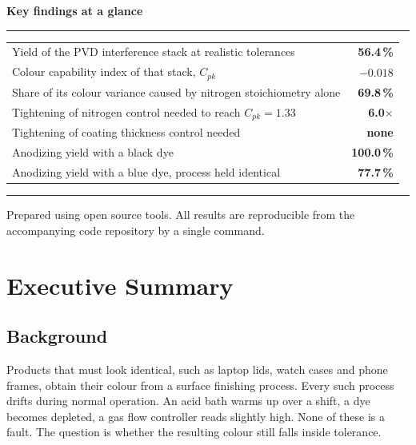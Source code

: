 \documentclass[11pt,a4paper]{article}
\newcommand{\Cpk}{\ensuremath{C_{pk}}}
\begin{document}
\begin{titlepage}
\vspace{1.0cm}

\begin{minipage}{0.86\textwidth}
{\bfseries\color{accent} Key findings at a glance}
\vspace{4pt}
\hrule
\vspace{6pt}
\small
\begin{tabular}{@{}p{8.6cm}r@{}}
Yield of the PVD interference stack at realistic tolerances
  & \textbf{56.4\,\%} \\[2pt]
Colour capability index of that stack, \Cpk
  & \textbf{$-0.018$} \\[2pt]
Share of its colour variance caused by nitrogen stoichiometry alone
  & \textbf{69.8\,\%} \\[2pt]
Tightening of nitrogen control needed to reach $\Cpk = 1.33$
  & \textbf{6.0$\times$} \\[2pt]
Tightening of coating thickness control needed
  & \textbf{none} \\[2pt]
Anodizing yield with a black dye
  & \textbf{100.0\,\%} \\[2pt]
Anodizing yield with a blue dye, process held identical
  & \textbf{77.7\,\%} \\
\end{tabular}
\vspace{6pt}
\hrule
\end{minipage}

\vfill
{\small Prepared using open source tools. All results are reproducible from the
accompanying code repository by a single command.}
\end{titlepage}

\setcounter{page}{2}

\section*{Executive Summary}

\subsection*{Background}

Products that must look identical, such as laptop lids, watch cases and phone
frames, obtain their colour from a surface finishing process. Every such
process drifts during normal operation. An acid bath warms up over a shift, a
dye becomes depleted, a gas flow controller reads slightly high. None of these
is a fault. The question is whether the resulting colour still falls inside
tolerance.
\end{document}
